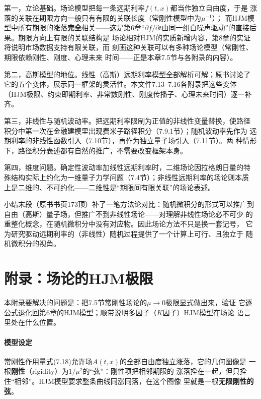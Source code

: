 第一，立论基础。场论模型把每一条远期利率$f(t,x)$都当作独立自由度，于是
涨落的关联在期限方向一般只有有限的关联长度（常刚性模型中为$\mu^{-1}$）；
而HJM模型中所有期限的涨落\textbf{完全}相关——这是第6章“$\partial
f/\partial t$由同一组白噪声驱动”的直接后果。期限方向上有限的关联结构是
场论相对HJM的实质新增内容，第8章的实证将说明市场数据支持有限关联，而
刻画这种关联可以有多种场论模型（常刚性、期限依赖刚性、刚度、心理未来
时间——正是本章7.5节与各附录的内容）。

第二，高斯模型的地位。线性（高斯）远期利率模型全部解析可解；原书讨论了
它的五个变体，展示同一框架的灵活性。本文件7.13--7.16各附录把这些变体
（HJM极限、约束即期利率、非常数刚性、刚度传播子、心理未来时间）逐一补齐。

第三，非线性与随机波动率。把远期利率限制为正值的非线性变量替换，使路径
积分中第一次在金融建模里出现费米子路径积分（7.9.1节）；随机波动率先作为
远期利率的非线性函数引入（7.10节），再作为独立量子场引入（7.11节）。两
种情形下，路径积分表述都有自然的推广，不需要改变框架本身。

第四，维度问题。确定性波动率加线性远期利率时，二维场论因拉格朗日量的特
殊结构实际上约化为一维量子力学问题（7.4节）；非线性远期利率的场论则本质
上是二维的、不可约化——二维性是“期限间有限关联”的场论表述。

小结末段（原书书页173顶）补了一笔方法论对比：随机微积分的形式可以推广到
自由（高斯）量子场，但推广不到非线性场论——对理解非线性场论必不可少
的重整化概念，在随机微积分中没有对应物。因此场论方法不只是换一套记号，
它为研究驱动远期利率的（非线性）随机过程提供了一个计算上可行、且独立于
随机微积分的视角。

\section{附录：场论的HJM极限}

本附录要解决的问题是：把7.5节常刚性场论的$\mu\to0$极限显式做出来，验证
它逐公式退化回第6章的HJM模型；顺带说明多因子（$K$因子）HJM模型在场论
语言里处在什么位置。

\paragraph{模型设定}
常刚性作用量式(7.18)允许场$A(t,x)$的全部自由度独立涨落，它的几何图像是
一根\textbf{刚性}（rigidity）为$1/\mu^{2}$的“弦”：刚性项把相邻期限的
涨落拴在一起，但只拴住“相邻”。HJM模型要求整条曲线同涨同落，在这个图像
里就是一根\textbf{无限刚性的弦}。

